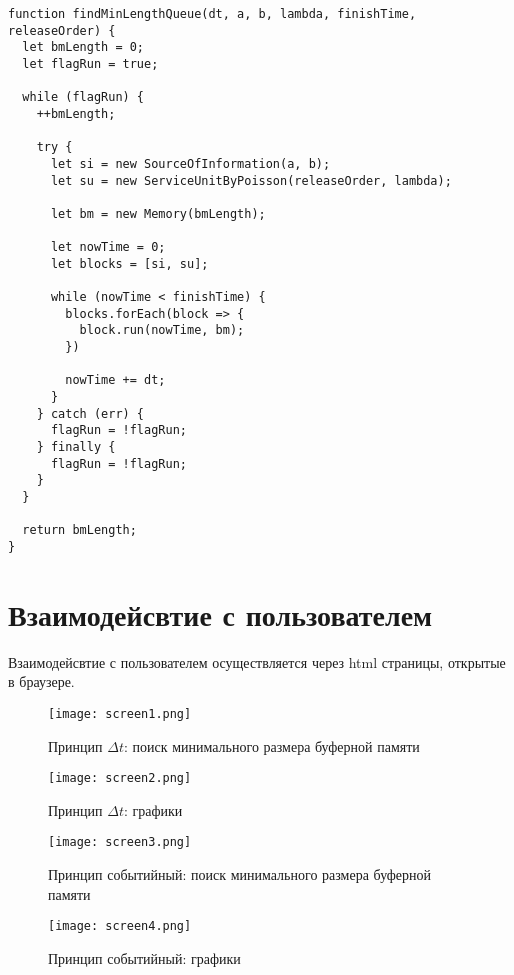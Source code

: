 \begin{lstlisting}[caption={Принцип dt: поиск минимального размера буферной памяти}]
function findMinLengthQueue(dt, a, b, lambda, finishTime, releaseOrder) {
  let bmLength = 0;
  let flagRun = true;

  while (flagRun) {
    ++bmLength;

    try {
      let si = new SourceOfInformation(a, b);
      let su = new ServiceUnitByPoisson(releaseOrder, lambda);

      let bm = new Memory(bmLength);

      let nowTime = 0;
      let blocks = [si, su];

      while (nowTime < finishTime) {
        blocks.forEach(block => {
          block.run(nowTime, bm);
        })

        nowTime += dt;
      }
    } catch (err) {
      flagRun = !flagRun;
    } finally {
      flagRun = !flagRun;
    }
  }

  return bmLength;
}
\end{lstlisting}

\section{Взаимодейсвтие с пользователем}

Взаимодейсвтие с пользователем осуществляется через html страницы, открытые в браузере.

\begin{figure}
  \centering
  \texttt{[image: screen1.png]}
  \caption{Принцип $\Delta t$: поиск минимального размера буферной памяти}
\end{figure}

\begin{figure}
  \centering
  \texttt{[image: screen2.png]}
  \caption{Принцип $\Delta t$: графики}
\end{figure}

\begin{figure}
  \centering
  \texttt{[image: screen3.png]}
  \caption{Принцип событийный: поиск минимального размера буферной памяти}
\end{figure}

\begin{figure}
  \centering
  \texttt{[image: screen4.png]}
  \caption{Принцип событийный: графики}
\end{figure}